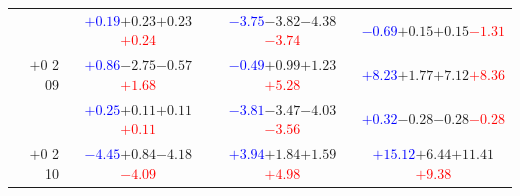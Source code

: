 \documentclass[compress]{beamer}
\begin{document}
\begin{frame}
\begin{tabular}{r | c | c | c}
          & \textcolor{blue}{$+0.19$}\hspace{0.1 cm}$+0.23$\hspace{0.1 cm}$+0.23$\hspace{0.1 cm}\textcolor{red}{$+0.24$} & \textcolor{blue}{$-3.75$}\hspace{0.1 cm}$-3.82$\hspace{0.1 cm}$-4.38$\hspace{0.1 cm}\textcolor{red}{$-3.74$} & \textcolor{blue}{$-0.69$}\hspace{0.1 cm}$+0.15$\hspace{0.1 cm}$+0.15$\hspace{0.1 cm}\textcolor{red}{$-1.31$} \\
$+$0 2 09 & \textcolor{blue}{$+0.86$}\hspace{0.1 cm}$-2.75$\hspace{0.1 cm}$-0.57$\hspace{0.1 cm}\textcolor{red}{$+1.68$} & \textcolor{blue}{$-0.49$}\hspace{0.1 cm}$+0.99$\hspace{0.1 cm}$+1.23$\hspace{0.1 cm}\textcolor{red}{$+5.28$} & \textcolor{blue}{$+8.23$}\hspace{0.1 cm}$+1.77$\hspace{0.1 cm}$+7.12$\hspace{0.1 cm}\textcolor{red}{$+8.36$} \\
          & \textcolor{blue}{$+0.25$}\hspace{0.1 cm}$+0.11$\hspace{0.1 cm}$+0.11$\hspace{0.1 cm}\textcolor{red}{$+0.11$} & \textcolor{blue}{$-3.81$}\hspace{0.1 cm}$-3.47$\hspace{0.1 cm}$-4.03$\hspace{0.1 cm}\textcolor{red}{$-3.56$} & \textcolor{blue}{$+0.32$}\hspace{0.1 cm}$-0.28$\hspace{0.1 cm}$-0.28$\hspace{0.1 cm}\textcolor{red}{$-0.28$} \\
$+$0 2 10 & \textcolor{blue}{$-4.45$}\hspace{0.1 cm}$+0.84$\hspace{0.1 cm}$-4.18$\hspace{0.1 cm}\textcolor{red}{$-4.09$} & \textcolor{blue}{$+3.94$}\hspace{0.1 cm}$+1.84$\hspace{0.1 cm}$+1.59$\hspace{0.1 cm}\textcolor{red}{$+4.98$} & \textcolor{blue}{$+15.12$}\hspace{0.1 cm}$+6.44$\hspace{0.1 cm}$+11.41$\hspace{0.1 cm}\textcolor{red}{$+9.38$} \\

\end{tabular}
\end{frame}
\end{document}

